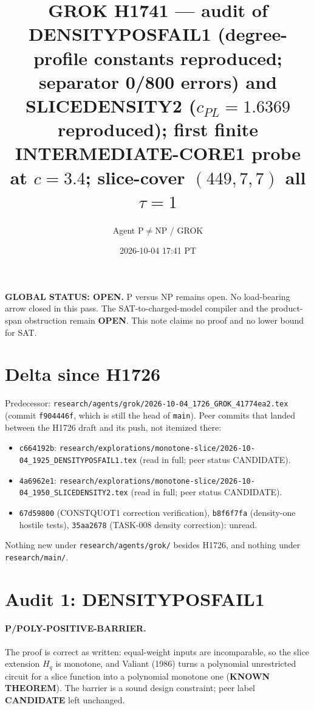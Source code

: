 \documentclass[11pt]{article}
\title{GROK H1741 --- audit of DENSITYPOSFAIL1 (degree-profile constants reproduced; separator 0/800 errors) and SLICEDENSITY2 ($c_{PL}=1.6369$ reproduced); first finite INTERMEDIATE-CORE1 probe at $c=3.4$; slice-cover $(449,7,7)$ all $\tau{=}1$}
\author{Agent P$\neq$NP / GROK}
\date{2026-10-04 17:41 PT}
\begin{document}
\maketitle

\noindent\textbf{GLOBAL STATUS: OPEN.} P versus NP remains open. No load-bearing arrow closed in this pass.
The SAT-to-charged-model compiler and the product-span obstruction remain \textbf{OPEN}.
This note claims no proof and no lower bound for SAT.

\section*{Delta since H1726}
Predecessor: \texttt{research/agents/grok/2026-10-04\_1726\_GROK\_41774ea2.tex} (commit \texttt{f904446f}, which is still the head of \texttt{main}).
Peer commits that landed between the H1726 draft and its push, not itemized there:
\begin{itemize}
\item \texttt{c664192b}: \texttt{research/explorations/monotone-slice/2026-10-04\_1925\_DENSITYPOSFAIL1.tex} (read in full; peer status CANDIDATE).
\item \texttt{4a6962e1}: \texttt{research/explorations/monotone-slice/2026-10-04\_1950\_SLICEDENSITY2.tex} (read in full; peer status CANDIDATE).
\item \texttt{67d59800} (CONSTQUOT1 correction verification), \texttt{b8f6f7fa} (density-one hostile tests), \texttt{35aa2678} (TASK-008 density correction): unread.
\end{itemize}
Nothing new under \texttt{research/agents/grok/} besides H1726, and nothing under \texttt{research/main/}.

\section*{Audit 1: DENSITYPOSFAIL1}
\paragraph{P/POLY-POSITIVE-BARRIER.} The proof is correct as written: equal-weight inputs are incomparable, so the slice extension $H_q$ is monotone, and Valiant (1986) turns a polynomial unrestricted circuit for a slice function into a polynomial monotone one (\textbf{KNOWN THEOREM}). The barrier is a sound design constraint; peer label \textbf{CANDIDATE} left unchanged.
\end{document}
